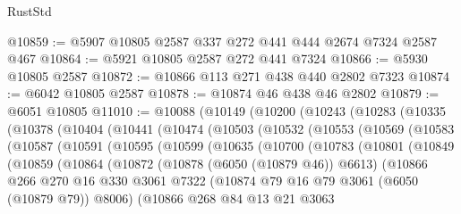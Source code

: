 \begin{lexlean}{RustStd}
\begin{coremodule}
@10859 := @5907 @10805 @2587 @337 @272 @441 @444 @2674 @7324 @2587 @467
@10864 := @5921 @10805 @2587 @272 @441 @7324
@10866 := @5930 @10805 @2587
@10872 := @10866 @113 @271 @438 @440 @2802 @7323
@10874 := @6042 @10805 @2587
@10878 := @10874 @46 @438 @46 @2802
@10879 := @6051 @10805
@11010 := @10088
    (@10149
      (@10200
        (@10243
          (@10283
            (@10335
              (@10378
                (@10404
                  (@10441
                    (@10474
                      (@10503
                        (@10532
                          (@10553
                            (@10569
                              (@10583
                                (@10587
                                  (@10591
                                    (@10595
                                      (@10599
                                        (@10635
                                          (@10700
                                            (@10783
                                              (@10801
                                                (@10849
                                                  (@10859
                                                    (@10864
                                                      (@10872
                                                        (@10878 (@6050 (@10879 @46)) @6613)
                                                        (@10866
                                                          @266
                                                          @270
                                                          @16
                                                          @330
                                                          @3061
                                                          @7322
                                                          (@10874
                                                            @79
                                                            @16
                                                            @79
                                                            @3061
                                                            (@6050 (@10879 @79))
                                                            @8006)
                                                          (@10866
                                                            @268
                                                            @84
                                                            @13
                                                            @21
                                                            @3063

\end{coremodule}
\end{lexlean}
